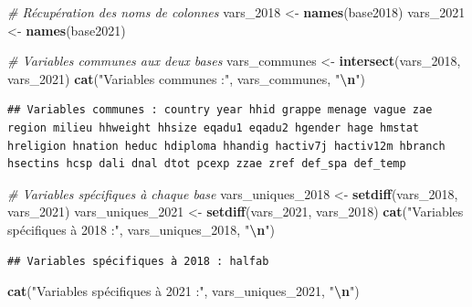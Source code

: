\documentclass[
]{article}
\newenvironment{Shaded}{\begin{snugshade}}{\end{snugshade}}
\newcommand{\CommentTok}[1]{\textcolor[rgb]{0.56,0.35,0.01}{\textit{#1}}}
\newcommand{\FunctionTok}[1]{\textcolor[rgb]{0.13,0.29,0.53}{\textbf{#1}}}
\newcommand{\NormalTok}[1]{#1}
\newcommand{\OtherTok}[1]{\textcolor[rgb]{0.56,0.35,0.01}{#1}}
\newcommand{\SpecialCharTok}[1]{\textcolor[rgb]{0.81,0.36,0.00}{\textbf{#1}}}
\newcommand{\StringTok}[1]{\textcolor[rgb]{0.31,0.60,0.02}{#1}}
\begin{document}
\begin{Shaded}
\begin{Highlighting}[]
\CommentTok{\# Récupération des noms de colonnes}
\NormalTok{vars\_2018 }\OtherTok{\textless{}{-}} \FunctionTok{names}\NormalTok{(base2018)}
\NormalTok{vars\_2021 }\OtherTok{\textless{}{-}} \FunctionTok{names}\NormalTok{(base2021)}

\CommentTok{\# Variables communes aux deux bases}
\NormalTok{vars\_communes }\OtherTok{\textless{}{-}} \FunctionTok{intersect}\NormalTok{(vars\_2018, vars\_2021)}
\FunctionTok{cat}\NormalTok{(}\StringTok{"Variables communes :"}\NormalTok{, vars\_communes, }\StringTok{"}\SpecialCharTok{\textbackslash{}n}\StringTok{"}\NormalTok{)}
\end{Highlighting}
\end{Shaded}

\begin{verbatim}
## Variables communes : country year hhid grappe menage vague zae region milieu hhweight hhsize eqadu1 eqadu2 hgender hage hmstat hreligion hnation heduc hdiploma hhandig hactiv7j hactiv12m hbranch hsectins hcsp dali dnal dtot pcexp zzae zref def_spa def_temp
\end{verbatim}

\begin{Shaded}
\begin{Highlighting}[]
\CommentTok{\# Variables spécifiques à chaque base}
\NormalTok{vars\_uniques\_2018 }\OtherTok{\textless{}{-}} \FunctionTok{setdiff}\NormalTok{(vars\_2018, vars\_2021)}
\NormalTok{vars\_uniques\_2021 }\OtherTok{\textless{}{-}} \FunctionTok{setdiff}\NormalTok{(vars\_2021, vars\_2018)}
\FunctionTok{cat}\NormalTok{(}\StringTok{"Variables spécifiques à 2018 :"}\NormalTok{, vars\_uniques\_2018, }\StringTok{"}\SpecialCharTok{\textbackslash{}n}\StringTok{"}\NormalTok{)}
\end{Highlighting}
\end{Shaded}

\begin{verbatim}
## Variables spécifiques à 2018 : halfab
\end{verbatim}

\begin{Shaded}
\begin{Highlighting}[]
\FunctionTok{cat}\NormalTok{(}\StringTok{"Variables spécifiques à 2021 :"}\NormalTok{, vars\_uniques\_2021, }\StringTok{"}\SpecialCharTok{\textbackslash{}n}\StringTok{"}\NormalTok{)}
\end{Highlighting}
\end{Shaded}
\end{document}
